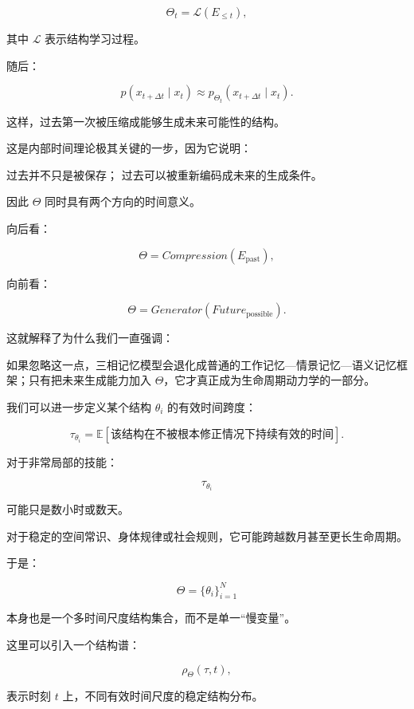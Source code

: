 \[
\Theta_t
=
\mathcal{L}
\left(
E_{\leq t}
\right),
\]

其中 $\mathcal{L}$ 表示结构学习过程。

随后：

\[
p(x_{t+\Delta t}\mid x_t)
\approx
p_{\Theta_t}
(x_{t+\Delta t}\mid x_t).
\]

这样，过去第一次被压缩成能够生成未来可能性的结构。

这是内部时间理论极其关键的一步，因为它说明：

\begin{statementbox}
过去并不只是被保存；
过去可以被重新编码成未来的生成条件。
\end{statementbox}

因此 $\Theta$ 同时具有两个方向的时间意义。

向后看：

\[
\Theta
=
Compression(E_{\mathrm{past}}),
\]

向前看：

\[
\Theta
=
Generator(Future_{\mathrm{possible}}).
\]

这就解释了为什么我们一直强调：

\begin{statementbox}
\centering
{}
\end{statementbox}

如果忽略这一点，三相记忆模型会退化成普通的工作记忆—情景记忆—语义记忆框架；只有把未来生成能力加入 $\Theta$，它才真正成为生命周期动力学的一部分。

我们可以进一步定义某个结构 $\theta_i$ 的有效时间跨度：

\[
\tau_{\theta_i}
=
\mathbb{E}
\left[
\text{该结构在不被根本修正情况下持续有效的时间}
\right].
\]

对于非常局部的技能：

\[
\tau_{\theta_i}
\]

可能只是数小时或数天。

对于稳定的空间常识、身体规律或社会规则，它可能跨越数月甚至更长生命周期。

于是：

\[
\Theta
=
\{\theta_i\}_{i=1}^{N}
\]

本身也是一个多时间尺度结构集合，而不是单一“慢变量”。

这里可以引入一个结构谱：

\[
\rho_{\Theta}(\tau,t),
\]

表示时刻 $t$ 上，不同有效时间尺度的稳定结构分布。

